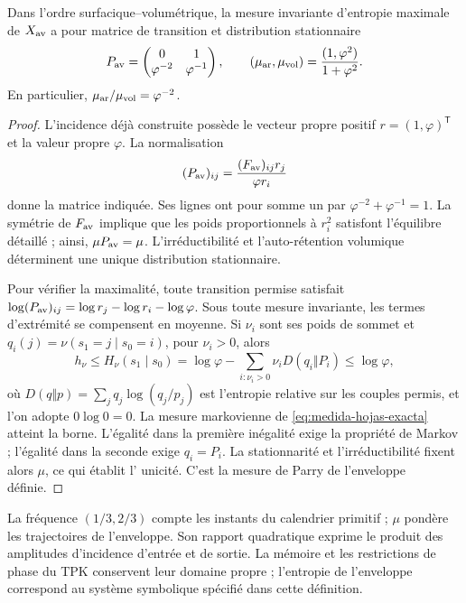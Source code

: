 \begin{proposition}
Dans l'ordre surfacique--volumétrique, la mesure invariante d'entropie maximale
de \(X_{\rm av}\) a pour matrice de transition et distribution stationnaire
\begin{equation}
 P_{\rm av}=\begin{pmatrix}0&1\\\varphi^{-2}&\varphi^{-1}\end{pmatrix},
 \qquad
 (\mu_{\rm ar},\mu_{\rm vol})
 =\frac{(1,\varphi^2)}{1+\varphi^2}.
 \label{eq:medida-hojas-exacta}
\end{equation}
En particulier, \(\mu_{\rm ar}/\mu_{\rm vol}=\varphi^{-2}\).
\end{proposition}
\begin{proof}
L'incidence déjà construite possède le vecteur propre positif \(r=(1,\varphi)^{\mathsf T}\) et la valeur propre \(\varphi\). La normalisation
\[
 (P_{\rm av})_{ij}
 =\frac{(F_{\rm av})_{ij}r_j}{\varphi r_i}
\]
donne la matrice indiquée. Ses lignes ont pour somme un par \(\varphi^{-2}+\varphi^{-1}=1\). La symétrie de \(F_{\rm av}\) implique que les poids proportionnels à \(r_i^2\) satisfont l'équilibre détaillé ; ainsi, \(\mu P_{\rm av}=\mu\). L'irréductibilité et l'auto-rétention volumique déterminent une unique distribution stationnaire.

Pour vérifier la maximalité, toute transition permise satisfait
\(\log(P_{\rm av})_{ij}=\log r_j-\log r_i-\log\varphi\).
Sous toute mesure invariante, les termes d'extrémité se compensent
en moyenne. Si \(\nu_i\) sont ses poids de sommet et
\(q_i(j)=\nu(s_1=j\mid s_0=i)\), pour \(\nu_i>0\), alors
\[
 h_\nu\leq H_\nu(s_1\mid s_0)
 =\log\varphi-\sum_{i:\nu_i>0}\nu_iD(q_i\Vert P_i)
 \leq\log\varphi,
\]
où \(D(q\Vert p)=\sum_jq_j\log(q_j/p_j)\) est l'entropie
relative sur les couples permis, et l'on adopte \(0\log0=0\).
La mesure markovienne de \eqref{eq:medida-hojas-exacta} atteint la borne.
L'égalité dans la première inégalité exige la propriété de Markov ;
l'égalité dans la seconde exige \(q_i=P_i\). La stationnarité et
l'irréductibilité fixent alors \(\mu\), ce qui établit l'
unicité. C'est la mesure de Parry de l'enveloppe définie.
\end{proof}

La fréquence \((1/3,2/3)\) compte les instants du calendrier primitif ;
\(\mu\) pondère les trajectoires de l'enveloppe. Son rapport quadratique
exprime le produit des amplitudes d'incidence d'entrée et de sortie.
La mémoire et les restrictions de phase du TPK conservent leur domaine
propre ; l'entropie de l'enveloppe correspond au système symbolique
spécifié dans cette définition.

